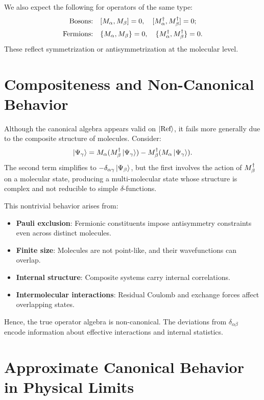 We also expect the following for operators of the same type:
\begin{align}
	\text{Bosons:} &\quad [M_{\alpha}, M_{\beta}] = 0, \quad [M^\dagger_{\alpha}, M^\dagger_{\beta}] = 0; \label{eq:boson_like_ops} \\
	\text{Fermions:} &\quad \{M_{\alpha}, M_{\beta}\} = 0, \quad \{M^\dagger_{\alpha}, M^\dagger_{\beta}\} = 0. \label{eq:fermion_like_ops}
\end{align}
These reflect symmetrization or antisymmetrization at the molecular level.

\section{Compositeness and Non-Canonical Behavior}
\label{sec:algebra_interpretation}

Although the canonical algebra appears valid on \(\ket{\text{Ref}}\), it fails more generally due to the composite structure of molecules. Consider:
\begin{equation}
	[\Mop{\alpha}, \Mdag{\beta}] \ket{\Psi_\gamma} = 
	\Mop{\alpha}(\Mdag{\beta} \ket{\Psi_\gamma}) 
	- \Mdag{\beta}(\Mop{\alpha} \ket{\Psi_\gamma}).
	\label{eq:comm_generic_state}
\end{equation}
The second term simplifies to \(-\delta_{\alpha\gamma} \ket{\Psi_\beta}\), but the first involves the action of \(M^\dagger_{\beta}\) on a molecular state, producing a multi-molecular state whose structure is complex and not reducible to simple \(\delta\)-functions.

This nontrivial behavior arises from:
\begin{itemize}
	\item \textbf{Pauli exclusion}: Fermionic constituents impose antisymmetry constraints even across distinct molecules.
	\item \textbf{Finite size}: Molecules are not point-like, and their wavefunctions can overlap.
	\item \textbf{Internal structure}: Composite systems carry internal correlations.
	\item \textbf{Intermolecular interactions}: Residual Coulomb and exchange forces affect overlapping states.
\end{itemize}

Hence, the true operator algebra is non-canonical. The deviations from \(\delta_{\alpha\beta}\) encode information about effective interactions and internal statistics.

\section{Approximate Canonical Behavior in Physical Limits}
\label{sec:algebra_approximations}

